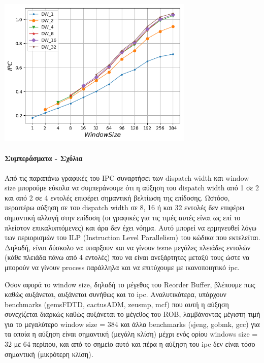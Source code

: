    \begin{minipage}{\textwidth}
      \begin{center}
         \\
         \vspace{3mm}
         \includegraphics[width=0.7\textwidth, frame]{./graphs/ipc/GemsFDTD.png}
         \vspace{6mm}
      \end{center}
   \end{minipage}


   \paragraph{Συμπεράσματα - Σχόλια}
   Από τις παραπάνω γραφικές του IPC συναρτήσει των dispatch width και window
   size μπορούμε εύκολα να συμπεράνουμε ότι η αύξηση του dispatch width από 1 σε
   2 και από 2 σε 4 εντολές επιφέρει σημαντική βελτίωση της επίδοσης. Ωστόσο,
   περαιτέρω αύξηση σε του dispatch width σε 8, 16 ή και 32 εντολές δεν επιφέρει
   σημαντική αλλαγή στην επίδοση (οι γραφικές για τις τιμές αυτές είναι ως επί
   το πλείστον επικαλυπτόμενες) και άρα δεν έχει νόημα. Αυτό μπορεί να
   ερμηνευθεί λόγω των περιορισμών του ILP (Instruction Level Parallelism) του
   κώδικα που εκτελείται. Δηλαδή, είναι δύσκολο να υπαρξουν και να γίνουν issue
   μεγάλες πλειάδες εντολών (κάθε πλειάδα πάνω από 4 εντολές) που να είναι
   ανεξάρτητες μεταξύ τους ώστε να μπορούν να γίνουν process παράλληλα και να
   επιτύχουμε με ικανοποιητικό ipc. 


   Όσον αφορά το window size, δηλαδή το μέγεθος του Reorder Buffer, βλέπουμε πως
   καθώς αυξάνεται, αυξάνεται συνήθως και το ipc. Αναλυτικότερα, υπάρχουν
   benchmarks (gemsFDTD, cactusADM, zeusmp, mcf)  που αυτή η αύξηση συνεχίζεται
   διαρκώς καθώς αυξάνεται το μέγεθος του ROB, λαμβάνοντας μέγιστη τιμή για το
   μεγαλύτερο window size = 384 και άλλα benchmarks (sjeng, gobmk, gcc) για τα
   οποία η αύξηση είναι σημαντική (μεγάλη κλίση) μέχρι ενός ορίου windows size =
   32 με 64 περίπου, και από το σημείο αυτό και πέρα η αύξηση του ipc δεν είναι
   τόσο σημαντική (μικρότερη κλίση).
   
